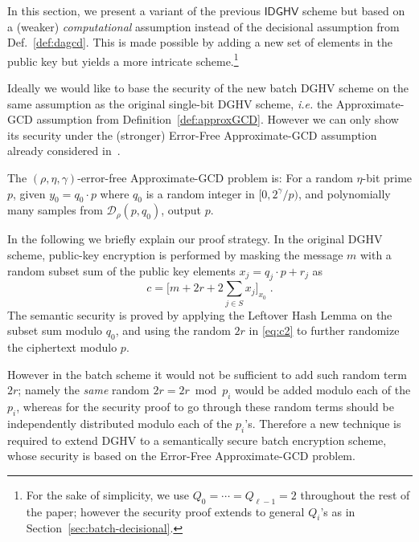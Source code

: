\documentclass{llncs}
\newcommand{\ie}{\textsl{i.e.}\xspace}
\newcommand*{\CDGHV}{\ensuremath{\mathsf{IDGHV}}}
\begin{document}
In this section, we present a variant of the previous $\CDGHV$ scheme
but based on a (weaker) \emph{computational} assumption instead of the
decisional assumption from Def.~\ref{def:dagcd}. This is made possible 
by adding a new set of elements in the public key but yields a more intricate 
scheme.\footnote{For the sake of simplicity, we use
  $Q_0=\cdots=Q_{\ell-1}=2$  
throughout the rest of the paper; however the security proof extends
to general $Q_i$'s as in Section~\ref{sec:batch-decisional}.}

Ideally we would like to base the security of the new batch DGHV scheme on
the same assumption as the original single-bit DGHV scheme, \ie the
Approximate-GCD assumption from Definition~\ref{def:approxGCD}.
However we can only show its security under the
(stronger) Error-Free Approximate-GCD assumption already considered
in~\cite{vDGHV2010,CMNT2011,CNT2012}. 
\begin{definition} 
The $(\rho, \eta,{\gamma})$-error-free Ap\-pro\-xi\-ma\-te-GCD pro\-blem
is: For a random $\eta$-bit prime $p$, given $y_0=q_0\cdot p$
where $q_0$ is a random integer in $[0,
  2^{\gamma}/p)$, and polynomially many samples from $\mathcal
  D_\rho(p,q_0)$, output $p$. 
\end{definition} 

In the following we briefly explain our proof strategy. 
 In the original DGHV scheme, public-key encryption is
performed by masking the message $m$ with a random subset sum of the
public key elements $x_j=q_j \cdot p + r_j$ as
\begin{equation}
\label{eq:c2}
c = \bigg[ m+2r+2 \sum\limits_{j \in S} x_j \bigg]_{x_0}\;.
\end{equation}
The semantic security is proved by applying the Leftover Hash Lemma on
the subset sum modulo $q_0$, and using the random $2r$ in
\eqref{eq:c2} to further 
randomize the ciphertext modulo $p$.

However in the batch scheme it would not be sufficient to add such
random term $2r$; namely the \emph{same} random
 $2r=2r \bmod p_i$ would be added 
modulo each of the $p_i$, whereas for the security proof to go through
these random terms should be independently distributed modulo each of the
$p_i$'s. Therefore a new technique is required to extend DGHV to
a semantically secure batch encryption scheme, whose security is based
on the Error-Free Approximate-GCD problem. 
\end{document}
